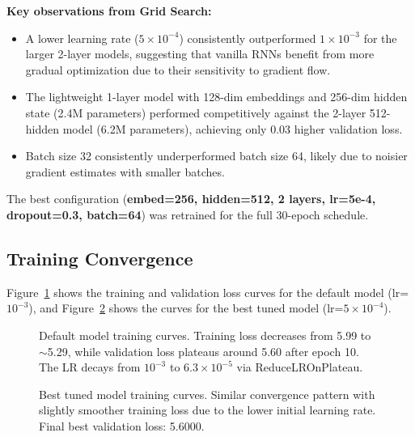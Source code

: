\documentclass[runningheads]{llncs}
\begin{document}
\textbf{Key observations from Grid Search:}
\begin{itemize}
    \item A lower learning rate ($5\times10^{-4}$) consistently outperformed $1\times10^{-3}$ for the larger 2-layer models, suggesting that vanilla RNNs benefit from more gradual optimization due to their sensitivity to gradient flow.
    \item The lightweight 1-layer model with 128-dim embeddings and 256-dim hidden state (2.4M parameters) performed competitively against the 2-layer 512-hidden model (6.2M parameters), achieving only 0.03 higher validation loss.
    \item Batch size 32 consistently underperformed batch size 64, likely due to noisier gradient estimates with smaller batches.
\end{itemize}

The best configuration (\textbf{embed=256, hidden=512, 2 layers, lr=5e-4, dropout=0.3, batch=64}) was retrained for the full 30-epoch schedule.

\subsection{Training Convergence}

Figure~\ref{fig:loss_default} shows the training and validation loss curves for the default model (lr=$10^{-3}$), and Figure~\ref{fig:loss_best} shows the curves for the best tuned model (lr=$5\times10^{-4}$).

\begin{figure}[H]
\centering
{}
\caption{Default model training curves. Training loss decreases from 5.99 to $\sim$5.29, while validation loss plateaus around 5.60 after epoch 10. The LR decays from $10^{-3}$ to $6.3\times10^{-5}$ via ReduceLROnPlateau.}
\label{fig:loss_default}
\end{figure}

\begin{figure}[H]
\centering
{}
\caption{Best tuned model training curves. Similar convergence pattern with slightly smoother training loss due to the lower initial learning rate. Final best validation loss: 5.6000.}
\label{fig:loss_best}
\end{figure}
\end{document}
